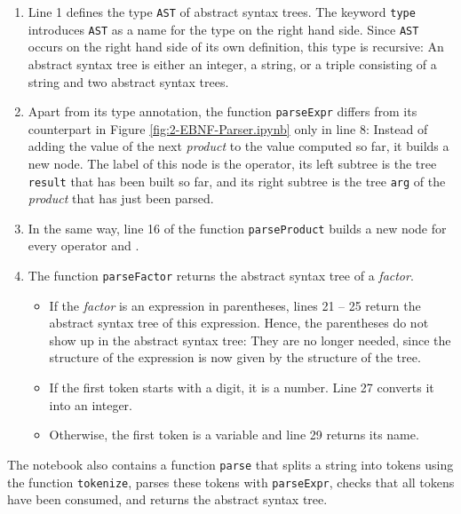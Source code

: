 \begin{enumerate}
\item Line 1 defines the type \texttt{AST} of abstract syntax trees.  The keyword \texttt{type} introduces
      \texttt{AST} as a name for the type on the right hand side.  Since \texttt{AST} occurs on the right hand
      side of its own definition, this type is recursive:  An abstract syntax tree is either an integer, a
      string, or a triple consisting of a string and two abstract syntax trees.
\item Apart from its type annotation, the function \texttt{parseExpr} differs from its counterpart in
      Figure \ref{fig:2-EBNF-Parser.ipynb} only in line 8:  Instead of adding the value of the next \textsl{product} to the value computed so far,
      it builds a new node.  The label of this node is the operator, its left subtree is the tree
      \texttt{result} that has been built so far, and its right subtree is the tree \texttt{arg} of the
      \textsl{product} that has just been parsed.
\item In the same way, line 16 of the function \texttt{parseProduct} builds a new node for every
      operator \squoted{*} and \squoted{/}.
\item The function \texttt{parseFactor} returns the abstract syntax tree of a \textsl{factor}.
      \begin{itemize}
      \item If the \textsl{factor} is an expression in parentheses, lines 21 -- 25 return the abstract syntax
            tree of this expression.  Hence, the parentheses do not show up in the abstract syntax tree:  They
            are no longer needed, since the structure of the expression is now given by the structure of
            the tree.
      \item If the first token starts with a digit, it is a number.  Line 27 converts it into an integer.
      \item Otherwise, the first token is a variable and line 29 returns its name.
      \end{itemize}
\end{enumerate}
The notebook also contains a function \texttt{parse} that splits a string into tokens using the function
\texttt{tokenize}, parses these tokens with \texttt{parseExpr}, checks that all tokens have been consumed,
and returns the abstract syntax tree.

